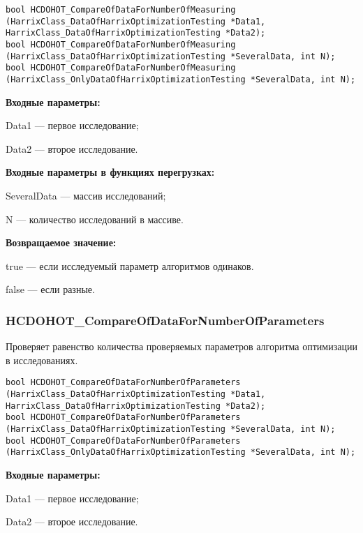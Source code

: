 \documentclass[a4paper,12pt]{article}
\begin{document}
\begin{lstlisting}[label=code_syntax_HCDOHOT_CompareOfDataForNumberOfMeasuring,caption=Синтаксис]
bool HCDOHOT_CompareOfDataForNumberOfMeasuring (HarrixClass_DataOfHarrixOptimizationTesting *Data1, HarrixClass_DataOfHarrixOptimizationTesting *Data2);
bool HCDOHOT_CompareOfDataForNumberOfMeasuring (HarrixClass_DataOfHarrixOptimizationTesting *SeveralData, int N);
bool HCDOHOT_CompareOfDataForNumberOfMeasuring (HarrixClass_OnlyDataOfHarrixOptimizationTesting *SeveralData, int N);
\end{lstlisting}

\textbf{Входные параметры:}

Data1 --- первое исследование;
 
Data2 --- второе исследование.
	 
\textbf{Входные параметры в функциях перегрузках:}

SeveralData --- массив исследований;
 
N --- количество исследований в массиве.

\textbf{Возвращаемое значение:}

true --- если исследуемый параметр алгоритмов одинаков.
 
false --- если разные.


\subsubsection{HCDOHOT\_CompareOfDataForNumberOfParameters}\label{HCDOHOT_CompareOfDataForNumberOfParameters}

Проверяет равенство количества проверяемых параметров алгоритма оптимизации в исследованиях.


\begin{lstlisting}[label=code_syntax_HCDOHOT_CompareOfDataForNumberOfParameters,caption=Синтаксис]
bool HCDOHOT_CompareOfDataForNumberOfParameters (HarrixClass_DataOfHarrixOptimizationTesting *Data1, HarrixClass_DataOfHarrixOptimizationTesting *Data2);
bool HCDOHOT_CompareOfDataForNumberOfParameters (HarrixClass_DataOfHarrixOptimizationTesting *SeveralData, int N);
bool HCDOHOT_CompareOfDataForNumberOfParameters (HarrixClass_OnlyDataOfHarrixOptimizationTesting *SeveralData, int N);
\end{lstlisting}

\textbf{Входные параметры:}

Data1 --- первое исследование;
 
Data2 --- второе исследование.
	 
\end{document}
